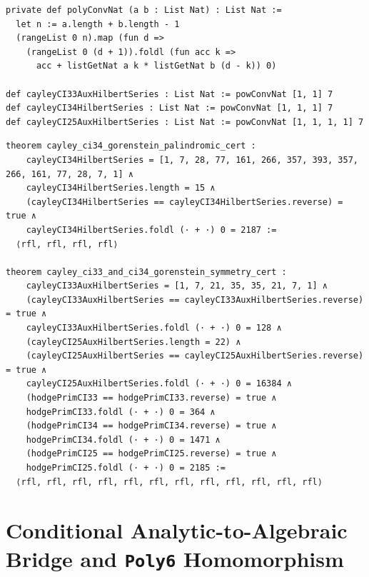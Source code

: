 \documentclass[11pt,a4paper]{article}
\begin{document}
\begin{lstlisting}[caption={Discrete Hilbert polynomial convolution and auxiliary rings in \texttt{CayleyCompleteInt.lean}.}]
private def polyConvNat (a b : List Nat) : List Nat :=
  let n := a.length + b.length - 1
  (rangeList 0 n).map (fun d =>
    (rangeList 0 (d + 1)).foldl (fun acc k =>
      acc + listGetNat a k * listGetNat b (d - k)) 0)

def cayleyCI33AuxHilbertSeries : List Nat := powConvNat [1, 1] 7
def cayleyCI34HilbertSeries : List Nat := powConvNat [1, 1, 1] 7
def cayleyCI25AuxHilbertSeries : List Nat := powConvNat [1, 1, 1, 1] 7
\end{lstlisting}

\begin{lstlisting}[caption={Auxiliary Gorenstein and primitive Hodge symmetry certificates in \texttt{CayleyCompleteInt.lean}.}]
theorem cayley_ci34_gorenstein_palindromic_cert :
    cayleyCI34HilbertSeries = [1, 7, 28, 77, 161, 266, 357, 393, 357, 266, 161, 77, 28, 7, 1] ∧
    cayleyCI34HilbertSeries.length = 15 ∧
    (cayleyCI34HilbertSeries == cayleyCI34HilbertSeries.reverse) = true ∧
    cayleyCI34HilbertSeries.foldl (· + ·) 0 = 2187 :=
  ⟨rfl, rfl, rfl, rfl⟩

theorem cayley_ci33_and_ci34_gorenstein_symmetry_cert :
    cayleyCI33AuxHilbertSeries = [1, 7, 21, 35, 35, 21, 7, 1] ∧
    (cayleyCI33AuxHilbertSeries == cayleyCI33AuxHilbertSeries.reverse) = true ∧
    cayleyCI33AuxHilbertSeries.foldl (· + ·) 0 = 128 ∧
    (cayleyCI25AuxHilbertSeries.length = 22) ∧
    (cayleyCI25AuxHilbertSeries == cayleyCI25AuxHilbertSeries.reverse) = true ∧
    cayleyCI25AuxHilbertSeries.foldl (· + ·) 0 = 16384 ∧
    (hodgePrimCI33 == hodgePrimCI33.reverse) = true ∧
    hodgePrimCI33.foldl (· + ·) 0 = 364 ∧
    (hodgePrimCI34 == hodgePrimCI34.reverse) = true ∧
    hodgePrimCI34.foldl (· + ·) 0 = 1471 ∧
    (hodgePrimCI25 == hodgePrimCI25.reverse) = true ∧
    hodgePrimCI25.foldl (· + ·) 0 = 2185 :=
  ⟨rfl, rfl, rfl, rfl, rfl, rfl, rfl, rfl, rfl, rfl, rfl, rfl⟩
\end{lstlisting}

\section{Conditional Analytic-to-Algebraic Bridge and \texttt{Poly6} Homomorphism}
\end{document}
